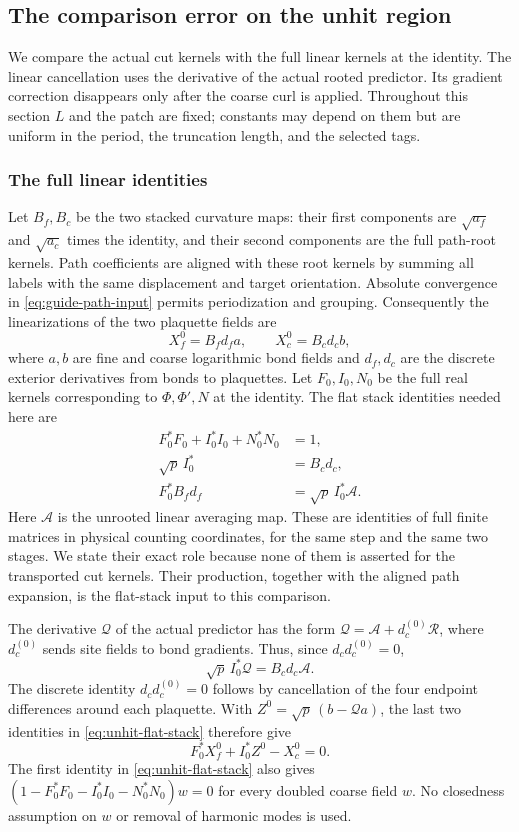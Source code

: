 \subsection{The comparison error on the unhit region}
\label{sec:seed-unhit-comparison}
We compare the actual cut kernels with the full linear kernels at the
identity. The linear cancellation uses the derivative of the actual
rooted predictor. Its gradient correction disappears only after the
coarse curl is applied. Throughout this section $L$ and the patch
are fixed; constants may depend on them but are uniform in the period,
the truncation length, and the selected tags.

\subsubsection{The full linear identities}
Let $B_f,B_c$ be the two stacked curvature maps: their first components
are $\sqrt{a_f}$ and $\sqrt{a_c}$ times the identity, and their
second components are the full path-root kernels. Path coefficients
are aligned with these root kernels by summing all labels with the
same displacement and target orientation. Absolute convergence in
\eqref{eq:guide-path-input} permits periodization and grouping.
Consequently the linearizations of the two plaquette fields are
\[
 X_f^0=B_f d_f a,\qquad X_c^0=B_c d_c b,
\]
where $a,b$ are fine and coarse logarithmic bond fields and $d_f,d_c$
are the discrete exterior derivatives from bonds to plaquettes.
Let $F_0,I_0,N_0$ be the full real kernels corresponding to
$\Phi,\Phi',N$ at the identity. The flat stack identities needed
here are
\begin{equation}\label{eq:unhit-flat-stack}
 \begin{split}
 F_0^*F_0+I_0^*I_0+N_0^*N_0&=1,\\
 \sqrt p\,I_0^*&=B_cd_c,\\
 F_0^*B_fd_f&=\sqrt p\,I_0^*\mathcal A.
 \end{split}
\end{equation}
Here $\mathcal A$ is the unrooted linear averaging map. These are
identities of full finite matrices in physical counting coordinates,
for the same step and the same two stages. We state their exact role
because none of them is asserted for the transported cut kernels.
Their production, together with the aligned path expansion, is the
flat-stack input to this comparison.

The derivative $\mathcal Q$ of the actual predictor has the form
$\mathcal Q=\mathcal A+d_c^{(0)}\mathcal R$, where
$d_c^{(0)}$ sends site fields to bond gradients. Thus, since
$d_cd_c^{(0)}=0$,
\[
 \sqrt p\,I_0^*\mathcal Q=B_cd_c\mathcal A.
\]
The discrete identity $d_cd_c^{(0)}=0$ follows by cancellation of
the four endpoint differences around each plaquette. With
$Z^0=\sqrt p\,(b-\mathcal Qa)$, the last two identities in
\eqref{eq:unhit-flat-stack} therefore give
\begin{equation}\label{eq:unhit-linear-zero}
 F_0^*X_f^0+I_0^*Z^0-X_c^0=0.
\end{equation}
The first identity in \eqref{eq:unhit-flat-stack} also gives
$(1-F_0^*F_0-I_0^*I_0-N_0^*N_0)w=0$ for every doubled coarse
field $w$. No closedness assumption on $w$ or removal of harmonic
modes is used.

